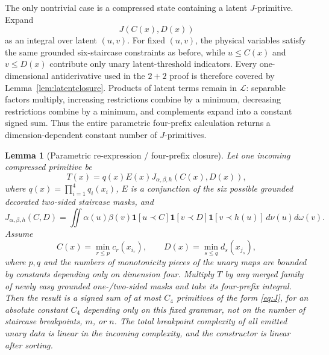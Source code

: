 \documentclass[12pt,a4paper]{article}
\newtheorem{lemma}[theorem]{Lemma}
\theoremstyle{definition}
\newcommand{\1}{\mathbf 1}
\begin{document}
The only nontrivial case is a compressed state containing a latent $J$-primitive. Expand
\[
J(C(x),D(x))
\]
as an integral over latent $(u,v)$. For fixed $(u,v)$, the physical variables satisfy the same grounded six-staircase constraints as before, while $u\le C(x)$ and $v\le D(x)$ contribute only unary latent-threshold indicators. Every one-dimensional antiderivative used in the $2+2$ proof is therefore covered by Lemma~\ref{lem:latentclosure}. Products of latent terms remain in $\mathcal L$: separable factors multiply, increasing restrictions combine by a minimum, decreasing restrictions combine by a minimum, and complements expand into a constant signed sum. Thus the entire parametric four-prefix calculation returns a dimension-dependent constant number of $J$-primitives.

\begin{lemma}[Parametric re-expression / four-prefix closure]       \label{lem:parametricclosure}
Let one incoming compressed primitive be
\begin{equation}
T(x)=q(x)E(x)J_{\alpha,\beta,h}(C(x),D(x)),                 \label{eq:incomingprimitive}
\end{equation}
where $q(x)=\prod_{i=1}^4q_i(x_i)$, $E$ is a conjunction of the six possible grounded decorated two-sided staircase masks, and
\[
J_{\alpha,\beta,h}(C,D)
 =\iint \alpha(u)\beta(v)
   \1[u\prec C]\1[v\prec D]\1[v\prec h(u)]\,d\nu(u)d\omega(v).
\]
Assume
\[
C(x)=\min_{r\le p}c_r(x_{i_r}),\qquad
D(x)=\min_{s\le q}d_s(x_{j_s}),
\]
where $p,q$ and the numbers of monotonicity pieces of the unary maps are bounded by constants depending only on dimension four.  Multiply $T$ by any merged family of newly easy grounded one-/two-sided masks and take its four-prefix integral.  Then the result is a signed sum of at most $C_4$ primitives of the form \eqref{eq:J}, for an absolute constant $C_4$ depending only on this fixed grammar, not on the number of staircase breakpoints, $m$, or $n$.  The total breakpoint complexity of all emitted unary data is linear in the incoming complexity, and the constructor is linear after sorting.
\end{lemma}
\end{document}
